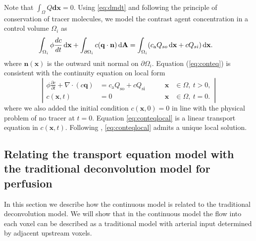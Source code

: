 \documentclass[journal,twocolumn]{IEEEtran}
\newcommand{\Qso}{Q_{\mathrm{so}}}
\newcommand{\Qsi}{Q_{\mathrm{si}}}
\newcommand{\ca}{c_\mathrm{a}}
\newcommand{\vq}{\mathbf{q}}
\newcommand{\vx}{\mathbf{x}}
\newcommand{\vdx}{\mathbf{dx}}
\begin{document}
	Note that $\int_\Omega Q  \vdx = 0$. 
	Using \eqref{eq:dmdt} and following the principle of conservation of tracer molecules, we model the contrast agent concentration in a control volume $\Omega_i$ as
	\begin{align}
		& \int_{\Omega_i} \phi \frac{d c}{dt} \diffint \vx + \int_{ \partial \Omega_i}c(\vq \cdot \mathbf{n}) \diffint \mathbf{A}
		 = \int_{\Omega_i}(\ca Q_{so} \diffint \vx + c Q_{si}) \diffint \vx.
		\label{eq:conteq}
	\end{align}
	where $\mathbf{n}(\vx)$ is the outward unit normal on $\partial \Omega_i$.
	Equation (\ref{eq:conteq}) is consistent with the continuity equation on local form
	\begin{equation}
		\left\vert
		\begin{alignedat}{2}
			\phi \frac{\partial c}{\partial t} + \nabla \cdot (c\vq) &= \ca\Qso + c\Qsi \qquad	&\vx &\in \Omega, \ t>0,  \\
			c(\vx,t) &= 0 																			 	&\vx &\in \Omega, \ t=0.
		\end{alignedat}
		\right\vert
		\label{eq:conteqlocal}
	\end{equation}
	where we also added the initial condition $c(\vx,0) = 0$ in line with the physical problem of no tracer at $t = 0$.
	Equation \eqref{eq:conteqlocal} is a linear transport equation in $c(\vx,t)$. 
	Following \cite{evans98}, \eqref{eq:conteqlocal} admits a unique local solution.


\subsection{Relating the transport equation model with the traditional deconvolution model for perfusion}\label{sec:NewAndOld}
	In this section we describe how the continuous model is related to the traditional deconvolution model.
	We will show that in the continuous model the flow into each voxel can be described as a traditional model with arterial input determined by adjacent upstream voxels.
\end{document}
